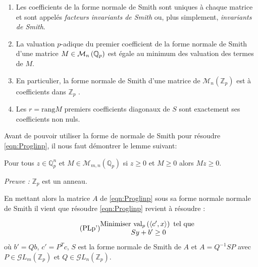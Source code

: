 \begin{definition}
\begin{remarques}

	
	\begin{enumerate}[label=\roman*.]
		\item Les coefficients de la forme normale de Smith sont uniques à chaque matrice et sont appelés \textit{facteurs invariants de Smith} ou, plus simplement, \textit{invariants de Smith}.
		\item La valuation $p$-adique du premier coefficient de la forme normale de Smith d'une matrice $M \in \mathcal{M}_n \left( \mathbb{Q}_p \right) $ est égale au minimum des valuation des termes de $M$.
		\item En particulier, la forme normale de Smith d'une matrice de $\mathcal{M}_n \left( \mathbb{Z}_p \right) $ est à coefficients dans $\mathbb{Z}_p$ .
		\item Les $r = \text{rang} M$ premiers coefficients diagonaux de $S$ sont exactement ses coefficients non nuls.  
	\end{enumerate}

\end{remarques}


Avant de pouvoir utiliser la forme de normale de Smith pour résoudre \ref{eqn:Proglinp}, il nous faut démontrer le lemme suivant:

\begin{lemme}
Pour tous $z \in \mathbb{Q}_{ p } ^n$ et $M \in \mathcal{M}_{m,n}\left( \mathbb{Q}_{ p }  \right)  $ si $z\ge 0$ et $M\ge 0$ alors $Mz\ge 0$.  
\end{lemme}
\textit{Preuve :} $\mathbb{Z}_p$ est un anneau. \hfill\qedsymbol



En mettant alors la matrice $A$ de \ref{eqn:Proglinp} sous sa forme normale normale de Smith il vient que résoudre \ref{eqn:Proglinp} revient à résoudre :    


\begin{equation}
	  \tag{PLp'}
\begin{matrix}
	\text{Minimiser } \text{val}_p\left(\left<c',x \right>\right) \text{ tel que }\\
	Sy + b' \ge 0
 \end{matrix}
	    \label{eqn:Proglinp2}
\end{equation}
où $b' = Qb$, $c' = P^Tc$, $S$ est la forme normale de Smith de $A$ et $A = Q^{-1} S P$ avec $P \in \mathcal{G}L_m\left( \mathbb{Z}_p \right)$ et $ Q \in \mathcal{G}L_n\left( \mathbb{Z}_p \right)$.


\end{definition}
